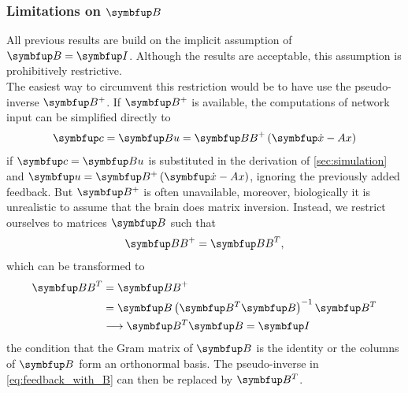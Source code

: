 \subsubsection{Limitations on $\bmu{B}$}
All previous results are build on the implicit assumption of $\bmu{B} = \bmu{I}$. Although the results are acceptable, this assumption is prohibitively restrictive.\\
The easiest way to circumvent this restriction would be to have use the pseudo-inverse  $\bmu{B}^+$. If $\bmu{B}^+$ is available, the computations of network input can be simplified directly to
\begin{equation}\label{eq:feedback_with_B}
	\bmu{c} = \bmu{Bu}= \bmu{BB}^+\left(\bmu{\dot{x}- Ax}\right)
\end{equation}
if $\bmu{c} = \bmu{Bu}$ is substituted in the derivation of \cref{sec:simulation} and $\bmu{u} = \bmu{B}^+\left(\bmu{\dot{x} - Ax}\right)$,
ignoring the previously added feedback. But $\bmu{B}^+$ is often unavailable, moreover, biologically it is unrealistic to assume that the brain does matrix inversion. Instead, we restrict ourselves to matrices $\bmu{B}$ such that
\begin{equation}
	\bmu{BB}^+ = \bmu{BB}^T,
\end{equation}
which can be transformed to
\begin{equation}
\begin{aligned}
	\bmu{BB}^T &= \bmu{BB}^+\\
			  &= \bmu{B}\left(\bmu{B}^T\bmu{B}\right)^{-1}\bmu{B}^T\\
			  &\longrightarrow \bmu{B}^T\bmu{B} = \bmu{I}
\end{aligned}
\end{equation}
the condition that the Gram matrix of $\bmu{B}$ is the identity or the columns of $\bmu{B}$ form an orthonormal basis. The pseudo-inverse in \cref{eq:feedback_with_B} can then be replaced by $\bmu{B}^T$.\\

